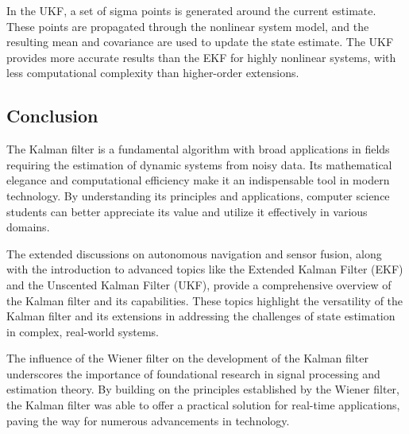 \documentclass[conference]{IEEEtran}
\begin{document}
In the UKF, a set of sigma points is generated around the current estimate. These points are
propagated through the nonlinear system model, and the resulting mean and covariance are used to
update the state estimate. The UKF provides more accurate results than the EKF for highly nonlinear
systems, with less computational complexity than higher-order extensions.

\subsection{Conclusion}
The Kalman filter is a fundamental algorithm with broad applications in fields requiring the
estimation of dynamic systems from noisy data. Its mathematical elegance and computational
efficiency make it an indispensable tool in modern technology. By understanding its principles and
applications, computer science students can better appreciate its value and utilize it effectively
in various domains.

The extended discussions on autonomous navigation and sensor fusion, along with the introduction to
advanced topics like the Extended Kalman Filter (EKF) and the Unscented Kalman Filter (UKF), provide
a comprehensive overview of the Kalman filter and its capabilities. These topics highlight the
versatility of the Kalman filter and its extensions in addressing the challenges of state estimation
in complex, real-world systems.

The influence of the Wiener filter on the development of the Kalman filter underscores the
importance of foundational research in signal processing and estimation theory. By building on the
principles established by the Wiener filter, the Kalman filter was able to offer a practical
solution for real-time applications, paving the way for numerous advancements in technology.
\end{document}
